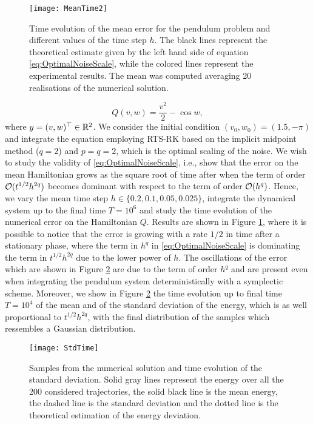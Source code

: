 \documentclass[10pt]{article}
\begin{document}
\begin{figure}[t]
	\centering
	\texttt{[image: MeanTime2]}
	\caption{Time evolution of the mean error for the pendulum problem and different values of the time step $h$. The black lines represent the theoretical estimate given by the left hand side of equation \eqref{eq:OptimalNoiseScale}, while the colored lines represent the experimental results. The mean was computed averaging 20 realisations of the numerical solution.}
	\label{fig:MeanTime}	
\end{figure}
\begin{equation}
	Q(v, w) = \frac{v^2}{2} - \cos w,
\end{equation}
where $y = (v, w)^\top \in \mathbb{R}^2$. We consider the initial condition $(v_0, w_0) = (1.5, -\pi)$ and integrate the equation employing RTS-RK based on the implicit midpoint method ($q = 2$) and $p = q = 2$, which is the optimal scaling of the noise. We wish to study the validity of \eqref{eq:OptimalNoiseScale}, i.e., show that the error on the mean Hamiltonian grows as the square root of time after when the term of order $\mathcal{O}(t^{1/2}h^{2q})$ becomes dominant with respect to the term of order $\mathcal{O}(h^q)$. Hence, we vary the mean time step $h \in \{0.2, 0.1, 0.05, 0.025\}$, integrate the dynamical system up to the final time $T = 10^6$ and study the time evolution of the numerical error on the Hamiltonian $Q$. Results are shown in Figure \ref{fig:MeanTime}, where it is possible to notice that the error is growing with a rate $1/2$ in time after a stationary phase, where the term in $h^q$ in \eqref{eq:OptimalNoiseScale} is dominating the term in $t^{1/2}h^{2q}$ due to the lower power of $h$. The oscillations of the error which are shown in Figure \ref{fig:StdTime} are due to the term of order $h^q$ and are present even when integrating the pendulum system deterministically with a symplectic scheme. Moreover, we show in Figure \ref{fig:StdTime} the time evolution up to final time $T = 10^4$ of the mean and of the standard deviation of the energy, which is as well proportional to $t^{1/2}h^{2q}$, with the final distribution of the samples which ressembles a Gaussian distribution.

\begin{figure}[t]
	\centering
	\texttt{[image: StdTime]}
	\caption{Samples from the numerical solution and time evolution of the standard deviation. Solid gray lines represent the energy over all the 200 considered trajectories, the solid black line is the mean energy, the dashed line is the standard deviation and the dotted line is the theoretical estimation of the energy deviation.}
	\label{fig:StdTime}	
\end{figure}
\end{document}
